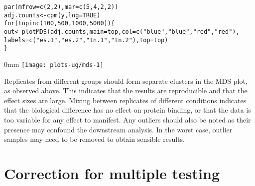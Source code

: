 \documentclass{report}\usepackage[]{graphicx}\usepackage[usenames,dvipsnames]{color}
\makeatletter
\def\maxwidth{ %
  \ifdim\Gin@nat@width>\linewidth
    \linewidth
  \else
    \Gin@nat@width
  \fi
}
\newcommand{\hlnum}[1]{\textcolor[rgb]{0.816,0.125,0.439}{#1}}%
\newcommand{\hlstr}[1]{\textcolor[rgb]{0.251,0.627,0.251}{#1}}%
\newcommand{\hlstd}[1]{\textcolor[rgb]{0.251,0.251,0.251}{#1}}%
\newcommand{\hlkwa}[1]{\textcolor[rgb]{0.125,0.125,0.941}{#1}}%
\newcommand{\hlkwb}[1]{\textcolor[rgb]{0,0,0}{#1}}%
\newcommand{\hlkwc}[1]{\textcolor[rgb]{0.251,0.251,0.251}{#1}}%
\newcommand{\hlkwd}[1]{\textcolor[rgb]{0.878,0.439,0.125}{#1}}%
\newenvironment{knitrout}{}{} %
\makeatother
\begin{document}
\begin{knitrout}
\color{fgcolor}\begin{kframe}
\begin{alltt}
\hlkwd{par}\hlstd{(}\hlkwc{mfrow}\hlstd{=}\hlkwd{c}\hlstd{(}\hlnum{2}\hlstd{,}\hlnum{2}\hlstd{),} \hlkwc{mar}\hlstd{=}\hlkwd{c}\hlstd{(}\hlnum{5}\hlstd{,}\hlnum{4}\hlstd{,}\hlnum{2}\hlstd{,}\hlnum{2}\hlstd{))}
\hlstd{adj.counts} \hlkwb{<-} \hlkwd{cpm}\hlstd{(y,} \hlkwc{log}\hlstd{=}\hlnum{TRUE}\hlstd{)}
\hlkwa{for} \hlstd{(top} \hlkwa{in} \hlkwd{c}\hlstd{(}\hlnum{100}\hlstd{,} \hlnum{500}\hlstd{,} \hlnum{1000}\hlstd{,} \hlnum{5000}\hlstd{)) \{}
    \hlstd{out} \hlkwb{<-} \hlkwd{plotMDS}\hlstd{(adj.counts,} \hlkwc{main}\hlstd{=top,} \hlkwc{col}\hlstd{=}\hlkwd{c}\hlstd{(}\hlstr{"blue"}\hlstd{,} \hlstr{"blue"}\hlstd{,} \hlstr{"red"}\hlstd{,} \hlstr{"red"}\hlstd{),}
                   \hlkwc{labels}\hlstd{=}\hlkwd{c}\hlstd{(}\hlstr{"es.1"}\hlstd{,} \hlstr{"es.2"}\hlstd{,} \hlstr{"tn.1"}\hlstd{,} \hlstr{"tn.2"}\hlstd{),} \hlkwc{top}\hlstd{=top)}
\hlstd{\}}
\end{alltt}
\end{kframe}\begin{adjustwidth}{\fltoffset}{0mm}
\texttt{[image: plots-ug/mds-1]} \end{adjustwidth}
\end{knitrout}

Replicates from different groups should form separate clusters in the MDS plot, as observed above.
This indicates that the results are reproducible and that the effect sizes are large.
Mixing between replicates of different conditions indicates that the biological difference has no effect on protein binding, or that the data is too variable for any effect to manifest.
Any outliers should also be noted as their presence may confound the downstream analysis.
In the worst case, outlier samples may need to be removed to obtain sensible results.




\chapter{Correction for multiple testing}
\end{document}
